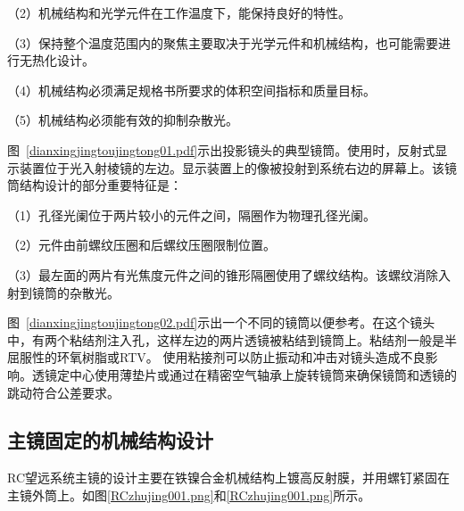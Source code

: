 （2）机械结构和光学元件在工作温度下，能保持良好的特性。

（3）保持整个温度范围内的聚焦主要取决于光学元件和机械结构，也可能需要进行无热化设计。

（4）机械结构必须满足规格书所要求的体积空间指标和质量目标。

（5）机械结构必须能有效的抑制杂散光。




图~\ref{dianxingjingtoujingtong01.pdf}示出投影镜头的典型镜筒。使用时，反射式显示装置位于光入射棱镜的左边。显示装置上的像被投射到系统右边的屏幕上。该镜筒结构设计的部分重要特征是：

（1）孔径光阑位于两片较小的元件之间，隔圈作为物理孔径光阑。

（2）元件由前螺纹压圈和后螺纹压圈限制位置。

（3）最左面的两片有光焦度元件之间的锥形隔圈使用了螺纹结构。该螺纹消除入射到镜筒的杂散光。

图~\ref{dianxingjingtoujingtong02.pdf}示出一个不同的镜筒以便参考。在这个镜头中，有两个粘结剂注入孔，这样左边的两片透镜被粘结到镜筒上。粘结剂一般是半屈服性的环氧树脂或RTV。
使用粘接剂可以防止振动和冲击对镜头造成不良影响。透镜定中心使用薄垫片或通过在精密空气轴承上旋转镜筒来确保镜筒和透镜的跳动符合公差要求。
\subsection{主镜固定的机械结构设计}
RC望远系统主镜的设计主要在铁镍合金机械结构上镀高反射膜，并用螺钉紧固在主镜外筒上。如图\ref{RCzhujing001.png}和\ref{RCzhujing001.png}所示。


